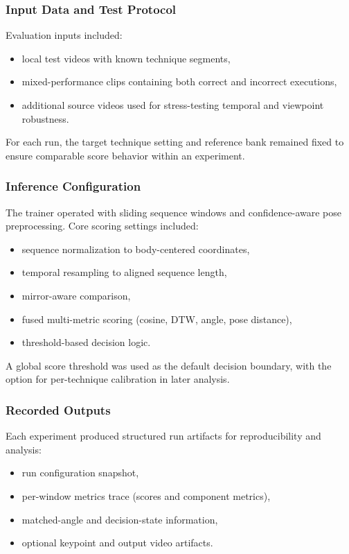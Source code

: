 \documentclass[12pt]{article}
\begin{document}
{\subsubsection{Input Data and Test Protocol}

Evaluation inputs included:

\begin{itemize}
    \item local test videos with known technique segments,
    \item mixed-performance clips containing both correct and incorrect executions,
    \item additional source videos used for stress-testing temporal and viewpoint robustness.
\end{itemize}

For each run, the target technique setting and reference bank remained fixed to ensure comparable score behavior within an experiment.

\subsubsection{Inference Configuration}

The trainer operated with sliding sequence windows and confidence-aware pose preprocessing. Core scoring settings included:

\begin{itemize}
    \item sequence normalization to body-centered coordinates,
    \item temporal resampling to aligned sequence length,
    \item mirror-aware comparison,
    \item fused multi-metric scoring (cosine, DTW, angle, pose distance),
    \item threshold-based decision logic.
\end{itemize}

A global score threshold was used as the default decision boundary, with the option for per-technique calibration in later analysis.

\subsubsection{Recorded Outputs}

Each experiment produced structured run artifacts for reproducibility and analysis:

\begin{itemize}
    \item run configuration snapshot,
    \item per-window metrics trace (scores and component metrics),
    \item matched-angle and decision-state information,
    \item optional keypoint and output video artifacts.
\end{itemize}

}
\end{document}
